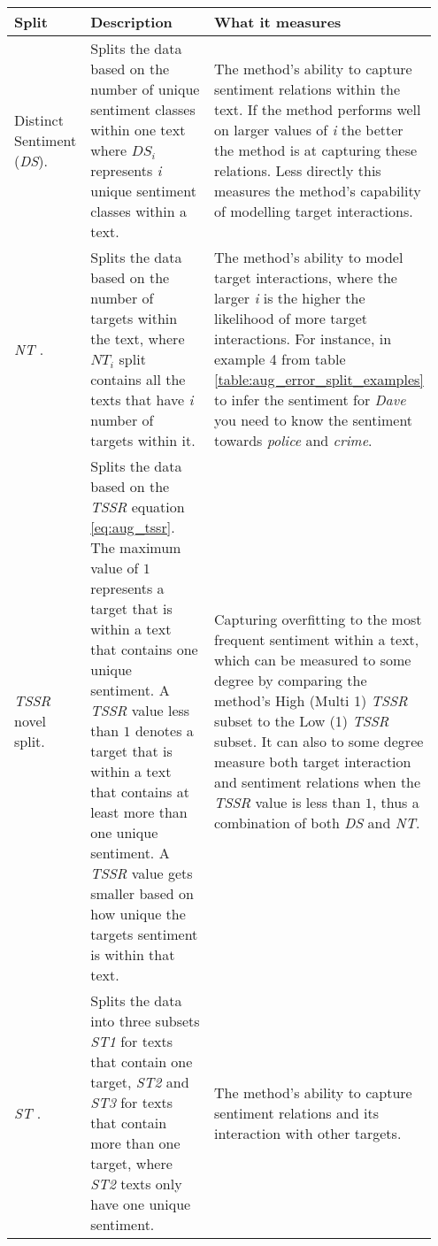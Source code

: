 \begin{longtable}{|p{0.15\linewidth}|p{0.4\linewidth}|p{0.4\linewidth}|}
\hline
Split & Description & What it measures \\
\hline
Distinct Sentiment (\textit{DS})\citep{wang-etal-2017-tdparse}. & Splits the data based on the number of unique sentiment classes within one text where $DS_i$ represents \textit{i} unique sentiment classes within a text. &  The method's ability to capture sentiment relations within the text. If the method performs well on larger values of \textit{i} the better the method is at capturing these relations. Less directly this measures the method's capability of modelling target interactions. \\
\hline
\textit{NT} \citep{zhang-etal-2019-aspect}. & Splits the data based on the number of targets within the text, where $NT_i$ split contains all the texts that have \textit{i} number of targets within it. & The method's ability to model target interactions, where the larger \textit{i} is the higher the likelihood of more target interactions. For instance, in example 4 from table \ref{table:aug_error_split_examples} to infer the sentiment for \textit{Dave} you need to know the sentiment towards \textit{police} and \textit{crime}.\\
\hline
\textit{TSSR} novel split. & Splits the data based on the \textit{TSSR} equation \ref{eq:aug_tssr}. The maximum value of $1$ represents a target that is within a text that contains one unique sentiment. A \textit{TSSR} value less than $1$ denotes a target that is within a text that contains at least more than one unique sentiment. A \textit{TSSR} value gets smaller based on how unique the targets sentiment is within that text. & Capturing overfitting to the most frequent sentiment within a text, which can be measured to some degree by comparing the method's High (Multi 1) \textit{TSSR} subset to the Low (1) \textit{TSSR} subset. It can also to some degree measure both target interaction and sentiment relations when the \textit{TSSR} value is less than $1$, thus a combination of both \textit{DS} and \textit{NT}.\\
\hline
\textit{ST} \citep{nguyen-shirai-2015-phrasernn}. & Splits the data into three subsets \textit{ST1} for texts that contain one target, \textit{ST2} and \textit{ST3} for texts that contain more than one target, where \textit{ST2} texts only have one unique sentiment. & The method's ability to capture sentiment relations and its interaction with other targets. \\

\end{longtable}
